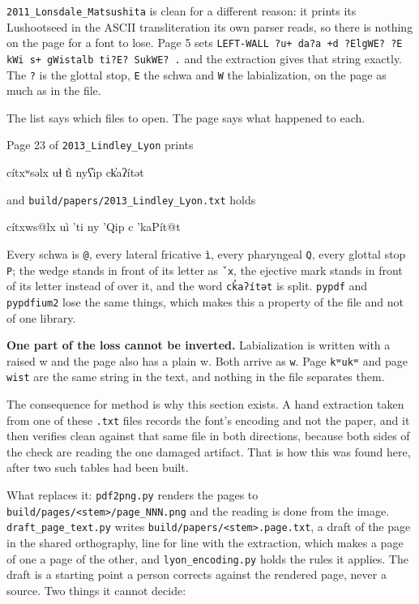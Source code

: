 \texttt{2011\_\allowbreak{}Lonsdale\_\allowbreak{}Matsushita} is clean for a different reason: it prints its Lushootseed in the ASCII transliteration its own parser reads, so there is nothing on the page for a font to lose. Page 5 sets \texttt{LEFT-\allowbreak{}WALL ?u+ da?a +d ?Elg\allowbreak{}WE? ?E k\allowbreak{}Wi s+ g\allowbreak{}Wistalb ti?E? Suk\allowbreak{}WE? .\allowbreak{}} and the extraction gives that string exactly. The \texttt{?} is the glottal stop, \texttt{E} the schwa and \texttt{W} the labialization, on the page as much as in the file.

The list says which files to open. The page says what happened to each.

Page 23 of \texttt{2013\_\allowbreak{}Lindley\_\allowbreak{}Lyon} prints

cítxʷsəlx uɬ t̓i nyʕ̓ip ck̓aʔítət

and \texttt{build/\allowbreak{}papers/\allowbreak{}2013\_\allowbreak{}Lindley\_\allowbreak{}Lyon.\allowbreak{}txt} holds

cítxws@lx uì ’ti ny ’Qip c ’kaPít@t

Every schwa is \texttt{@}, every lateral fricative \texttt{ì}, every pharyngeal \texttt{Q}, every glottal stop \texttt{P}; the wedge stands in front of its letter as \texttt{ˇx}, the ejective mark stands in front of its letter instead of over it, and the word \texttt{ck̓aʔítət} is split. \texttt{pypdf} and \texttt{pypdfium2} lose the same things, which makes this a property of the file and not of one library.

\textbf{One part of the loss cannot be inverted.} Labialization is written with a raised w and the page also has a plain w. Both arrive as \texttt{w}. Page \texttt{kʷukʷ} and page \texttt{wist} are the same string in the text, and nothing in the file separates them.

The consequence for method is why this section exists. A hand extraction taken from one of these \texttt{.\allowbreak{}txt} files records the font's encoding and not the paper, and it then verifies clean against that same file in both directions, because both sides of the check are reading the one damaged artifact. That is how this was found here, after two such tables had been built.

What replaces it: \texttt{pdf2png.\allowbreak{}py} renders the pages to \texttt{build/\allowbreak{}pages/\allowbreak{}<stem>/\allowbreak{}page\_\allowbreak{}NNN.\allowbreak{}png} and the reading is done from the image. \texttt{draft\_\allowbreak{}page\_\allowbreak{}text.\allowbreak{}py} writes \texttt{build/\allowbreak{}papers/\allowbreak{}<stem>.\allowbreak{}page.\allowbreak{}txt}, a draft of the page in the shared orthography, line for line with the extraction, which makes a page of one a page of the other, and \texttt{lyon\_\allowbreak{}encoding.\allowbreak{}py} holds the rules it applies. The draft is a starting point a person corrects against the rendered page, never a source. Two things it cannot decide:

